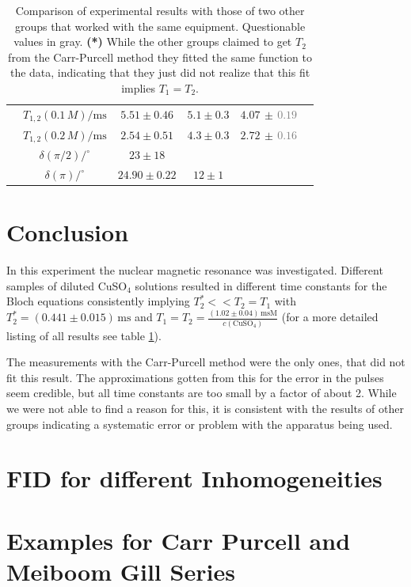\documentclass[a4paper]{scrartcl}
\numberwithin{equation}{section}
\numberwithin{figure}{section}
\numberwithin{table}{section}
\begin{document}
\begin{table}[!tbh]
\begin{tabular}{cccccc}
& $T_{1,2}(0.1\,M) / \text{ms}$ & $5.51\pm 0.46$ & $5.1\pm 0.3$ & $4.07\,\pm\,$\textcolor{Gray}{$0.19$} \\
& $T_{1,2}(0.2\,M) / \text{ms}$ & $2.54\pm 0.51$ & $4.3\pm 0.3$ & $2.72\,\pm\,$\textcolor{Gray}{$0.16$} \\
& $\delta(\pi/2) / ^\circ$ & $23 \pm 18$ & & \\
& $\delta(\pi) / ^\circ$ & $24.90\pm 0.22$ & $12\pm 1$ & \\
\midrule
\bottomrule
\end{tabular}
\caption{\small Comparison of experimental results with those of two other groups that worked with the same equipment. Questionable values in gray. \textbf{(*)} While the other groups claimed to get $T_2$ from the Carr-Purcell method they fitted the same function to the data, indicating that they just did not realize that this fit implies $T_1=T_2$. }
\label{tab:compare}
\end{table}


\section{Conclusion}
In this experiment the nuclear magnetic resonance was investigated. Different samples of diluted CuSO$_4$ solutions resulted in different time constants for the Bloch equations consistently implying $T_2^* << T_2 = T_1$ with $T_2^*=(0.441\pm 0.015)\,\text{ms}$ and $T_1=T_2= \frac{(1.02\pm 0.04)\,\text{msM}}{c(\text{CuSO}_4)}$ (for a more detailed listing of all results see table \ref{tab:compare}).

The measurements with the Carr-Purcell method were the only ones, that did not fit this result. The approximations gotten from this for the error in the pulses seem credible, but all time constants are too small by a factor of about 2. While we were not able to find a reason for this, it is consistent with the results of other groups indicating a systematic error or problem with the apparatus being used.


\FloatBarrier
\clearpage
 



\clearpage
\appendix
\section{FID for different Inhomogeneities}
\section{Examples for Carr Purcell and Meiboom Gill Series}
\end{document}

